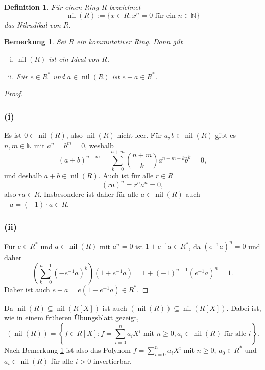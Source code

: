 \documentclass[a4paper,10pt]{article}
\newcounter{satze}
\newtheorem{bem}[satze]{Bemerkung}
\newtheorem*{defi}{Definition}
\theoremstyle{definition}
\newcommand{\N}{\mathbb{N}}
\newcommand{\nil}{\operatorname{nil}}
\begin{document}
\section{}

\begin{defi}
 Für einen Ring $R$ bezeichnet
 \[
  \nil(R) := \{x \in R : x^n = 0 \text{ für ein } n \in \N\}
 \]
 das Nilradikal von $R$.
\end{defi}

\begin{bem}\label{bem: nilradikal}
 Sei $R$ ein kommutativer Ring. Dann gilt
 \begin{enumerate}[(i)]
  \item $\nil(R)$ ist ein Ideal von $R$.
  \item Für $e \in R^*$ und $a \in \nil(R)$ ist $e+a \in R^*$.
 \end{enumerate}
\end{bem}

\begin{proof}
 \subsubsection*{(i)}
  Es ist $0 \in \nil(R)$, also $\nil(R)$ nicht leer. Für $a,b \in \nil(R)$ gibt es $n,m \in \N$ mit $a^n = b^m = 0$, weshalb
  \[
   (a+b)^{n+m} = \sum_{k=0}^{n+m} \binom{n+m}{k} a^{n+m-k} b^k = 0,
  \]
  und deshalb $a+b \in \nil(R)$. Auch ist für alle $r \in R$
  \[
   (ra)^n = r^n a^n = 0,
  \]
  also $ra \in R$. Insbesondere ist daher für alle $a \in \nil(R)$ auch $-a = (-1) \cdot a \in R$.
 \subsubsection*{(ii)}
  Für $e \in R^*$ und $a \in \nil(R)$ mit $a^n = 0$ ist $1+e^{-1}a \in R^*$, da $\left(e^{-1}a\right)^n = 0$ und daher
  \[
   \left(\sum_{k=0}^{n-1} \left(-e^{-1}a\right)^k\right) \left(1+e^{-1}a\right)
   = 1+ (-1)^{n-1} \left(e^{-1}a\right)^n
   = 1.
  \]
  Daher ist auch $e+a = e\left(1+e^{-1}a\right) \in R^*$.
\end{proof}

Da $\nil(R) \subseteq \nil(R[X])$ ist auch $\left(\nil(R)\right) \subseteq \nil(R[X])$. Dabei ist, wie in einem früheren Übungsblatt gezeigt,
\[
 \left(\nil(R)\right)
 = \left\{f \in R[X] : f = \sum_{i=0}^n a_i X^i \text{ mit } n \geq 0, a_i \in \nil(R) \text{ für alle } i\right\}.
\]
Nach Bemerkung \ref{bem: nilradikal} ist also das Polynom $f = \sum_{i=0}^n a_i X^i$ mit $n \geq 0$, $a_0 \in R^*$ und $a_i \in \nil(R)$ für alle $i > 0$ invertierbar.
\end{document}
